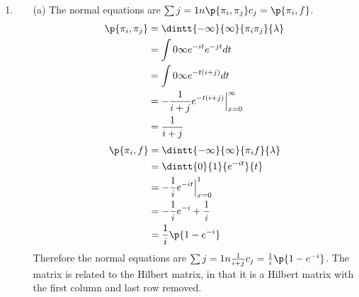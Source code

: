 \documentclass[11pt]{article}
\begin{document}
\begin{enumerate}
    \item %
        \begin{enumerate}
            \item[(a)]
                The normal equations are $\sum{j=1}{n}{\p{\pi_i, \pi_j} c_j}
                = \p{\pi_i, f}$.
                \begin{align*}
                    \p{\pi_i, \pi_j} &= \dintt{-\infty}{\infty}{\pi_i \pi_j}{\lambda} \\
                    &= \int{0}{\infty}{e^{-it} e^{-jt} dt} \\
                    &= \int{0}{\infty}{e^{-t(i + j)} dt} \\
                    &= -\frac{1}{i + j} e^{-t(i+j)} \Big|_{x = 0}^{\infty} \\
                    &= \frac{1}{i + j}
                \end{align*}
                \begin{align*}
                    \p{\pi_i, f} &= \dintt{-\infty}{\infty}{\pi_i f}{\lambda} \\
                    &= \dintt{0}{1}{e^{-it}}{t} \\
                    &= -\frac{1}{i} e^{-it} \Big|_{x = 0}^{1} \\
                    &= -\frac{1}{i} e^{-i} + \frac{1}{i} \\
                    &= \frac{1}{i} \p{1 - e^{-i}}
                \end{align*}
                Therefore the normal equations are
                $\sum{j=1}{n}{\frac{1}{i + j} c_j} = \frac{1}{i} \p{1 - e^{-i}}$.
                The matrix is related to the Hilbert matrix, in that it is a
                Hilbert matrix with the first column and last row removed.


\end{enumerate}
\end{enumerate}
\end{document}

